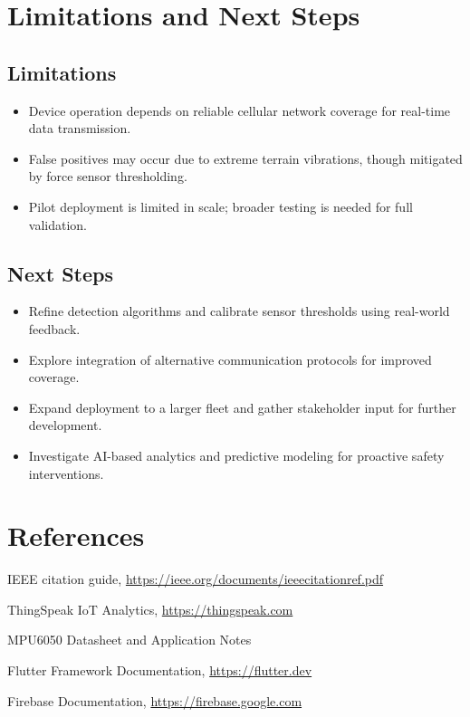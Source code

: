 \documentclass[12pt]{article}
\begin{document}

\section{Limitations and Next Steps}

\subsection{Limitations}
\begin{itemize}
  \item Device operation depends on reliable cellular network coverage for real-time data transmission.
  \item False positives may occur due to extreme terrain vibrations, though mitigated by force sensor thresholding.
  \item Pilot deployment is limited in scale; broader testing is needed for full validation.
\end{itemize}

\subsection{Next Steps}
\begin{itemize}
  \item Refine detection algorithms and calibrate sensor thresholds using real-world feedback.
  \item Explore integration of alternative communication protocols for improved coverage.
  \item Expand deployment to a larger fleet and gather stakeholder input for further development.
  \item Investigate AI-based analytics and predictive modeling for proactive safety interventions.
\end{itemize}

\section*{References}
\begin{thebibliography}{9}

 IEEE citation guide, \url{https://ieee.org/documents/ieeecitationref.pdf}

 ThingSpeak IoT Analytics, \url{https://thingspeak.com}

 MPU6050 Datasheet and Application Notes

 Flutter Framework Documentation, \url{https://flutter.dev}

 Firebase Documentation, \url{https://firebase.google.com}

\end{thebibliography}
\end{document}
